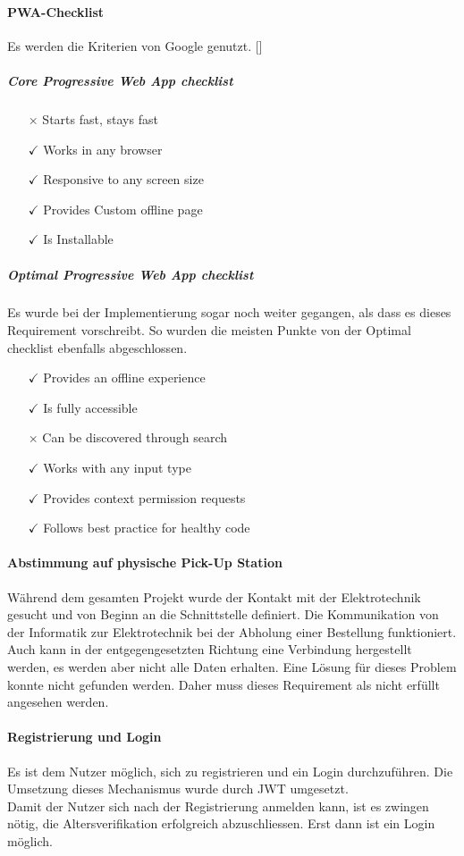 \paragraph{PWA-Checklist}
Es werden die Kriterien von Google genutzt. [\cite{pwaChecklist}]
\subparagraph{Core Progressive Web App checklist}
\begin{itemize}
	\item [{$\times$}] Starts fast, stays fast
	\item [{$\checkmark$}] Works in any browser
	\item [{$\checkmark$}] Responsive to any screen size
	\item [{$\checkmark$}] Provides Custom offline page
	\item [{$\checkmark$}] Is Installable
\end{itemize}
\subparagraph{Optimal Progressive Web App checklist}
Es wurde bei der Implementierung sogar noch weiter gegangen, als dass es dieses Requirement vorschreibt. So wurden die meisten Punkte von der Optimal checklist ebenfalls abgeschlossen. 
\begin{itemize}
	\item [{$\checkmark$}] Provides an offline experience
	\item [{$\checkmark$}] Is fully accessible
	\item [{$\times$}] Can be discovered through search
	\item [{$\checkmark$}] Works with any input type
	\item [{$\checkmark$}] Provides context permission requests
	\item [{$\checkmark$}] Follows best practice for healthy code
\end{itemize}

\paragraph{Abstimmung auf physische Pick-Up Station}
Während dem gesamten Projekt wurde der Kontakt mit der Elektrotechnik gesucht und von Beginn an die Schnittstelle definiert. Die Kommunikation von der Informatik zur Elektrotechnik bei der Abholung einer Bestellung funktioniert. Auch kann in der entgegengesetzten Richtung eine Verbindung hergestellt werden, es werden aber nicht alle Daten erhalten. Eine Lösung für dieses Problem konnte nicht gefunden werden. Daher muss dieses Requirement als nicht erfüllt angesehen werden. 

\paragraph{Registrierung und Login}
Es ist dem Nutzer möglich, sich zu registrieren und ein Login durchzuführen. Die Umsetzung dieses Mechanismus wurde durch \ac{JWT} umgesetzt. \\
Damit der Nutzer sich nach der Registrierung anmelden kann, ist es zwingen nötig, die Altersverifikation erfolgreich abzuschliessen. Erst dann ist ein Login möglich. 

